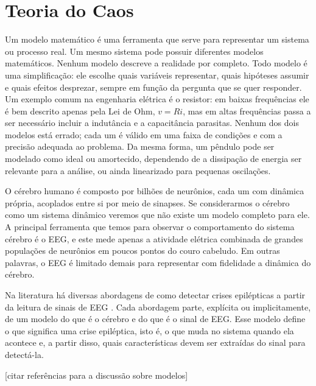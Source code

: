 \documentclass[]{article}
\begin{document}
	\section{Teoria do Caos}
	\label{sec:caos}
	\noindent

	Um modelo matemático é uma ferramenta que serve para representar um sistema ou processo real. Um mesmo sistema pode possuir diferentes modelos matemáticos. Nenhum modelo descreve a realidade por completo. Todo modelo é uma simplificação: ele escolhe quais variáveis representar, quais hipóteses assumir e quais efeitos desprezar, sempre em função da pergunta que se quer responder. Um exemplo comum na engenharia elétrica é o resistor: em baixas frequências ele é bem descrito apenas pela Lei de Ohm, $v = Ri$, mas em altas frequências passa a ser necessário incluir a indutância e a capacitância parasitas. Nenhum dos dois modelos está errado; cada um é válido em uma faixa de condições e com a precisão adequada ao problema. Da mesma forma, um pêndulo pode ser modelado como ideal ou amortecido, dependendo de a dissipação de energia ser relevante para a análise, ou ainda linearizado para pequenas oscilações.

	O cérebro humano é composto por bilhões de neurônios, cada um com dinâmica própria, acoplados entre si por meio de sinapses. Se considerarmos o cérebro como um sistema dinâmico veremos que não existe um modelo completo para ele. A principal ferramenta que temos para observar o comportamento do sistema cérebro é o EEG, e este mede apenas a atividade elétrica combinada de grandes populações de neurônios em poucos pontos do couro cabeludo. Em outras palavras, o EEG é limitado demais para representar com fidelidade a dinâmica do cérebro. 
	
	Na literatura há diversas abordagens de como detectar crises epilépticas a partir da leitura de sinais de EEG \cite{acharya2013automated}. Cada abordagem parte, explícita ou implicitamente, de um modelo do que é o cérebro e do que é o sinal de EEG. Esse modelo define o que significa uma crise epiléptica, isto é, o que muda no sistema quando ela acontece e, a partir disso, quais características devem ser extraídas do sinal para detectá-la.

	[citar referências para a discussão sobre modelos]
\end{document}
